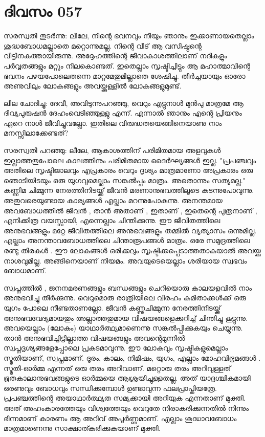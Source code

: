 \newpage
\section{ദിവസം 057}


സരസ്വതി തുടര്‍ന്നു: ലീലേ, നിന്റെ ഭവനവും നീയും ഞാനും ഇക്കാണായതെല്ലാം ശുദ്ധബോധമല്ലാതെ മറ്റൊന്നുമല്ല.  നിന്റെ വീട്‌ ആ വസിഷ്ഠന്റെ വീട്ടിനകത്തായിരുന്നു. അദ്ദേഹത്തിന്റെ ജീവാകാശത്തിലാണ്‌ നദികളും പര്‍വ്വതങ്ങളും മറ്റും നിലകൊണ്ടത്‌. ഇതെല്ലാം സൃഷ്ടിച്ചിട്ടും ആ മഹാത്മാവിന്റെ ഭവനം പഴയപോലെതന്നെ മാറ്റമേതുമില്ലാതെ ശേഷിച്ചു. തീര്‍ച്ചയായും ഓരോ അണുവിലും ലോകങ്ങളും അവയ്ക്കുള്ളില്‍ ലോകങ്ങളുമുണ്ട്‌.

ലീല ചോദിച്ചു: ദേവീ, അവിടുന്നുപറഞ്ഞു, വെറും എട്ടുനാള്‍ മുന്‍പു മാത്രമേ ആ ദിവ്യപുരുഷന്‍ ദേഹംവെടിഞ്ഞുള്ളു എന്ന്. എന്നാല്‍ ഞാനും എന്റെ പ്രിയനും ഏറെ നാള്‍ ജീവിച്ചുവല്ലോ. ഇതിലെ വിരുദ്ധതയെങ്ങിനെയാണു നാം മനസ്സിലാക്കേണ്ടത്‌?

സരസ്വതി പറഞ്ഞു: ലീലേ, ആകാശത്തിന്‌ പരിമിതമായ അളവുകള്‍ ഇല്ലാത്തതുപോലെ കാലത്തിനും പരിമിതമായ ദൈര്‍ഘ്യങ്ങള്‍ ഇല്ല. "പ്രപഞ്ചവും അതിലെ സൃഷ്ടിജാലവും എപ്രകാരം വെറും ദൃശ്യം മാത്രമാണോ അപ്രകാരം ഒരു ഞൊടിയിടയും ഒരു യുഗവുമെല്ലാം സങ്കല്‍പ്പം മാത്രം. അതൊന്നും സത്യമല്ല." കണ്ണിമ ചിമ്മുന്ന നേരത്തിനിടയ്ക്ക്‌ ജീവന്‍ മരണാനുഭവത്തിലൂടെ കടന്നുപോവുന്നു. അതുവരെയുണ്ടായ കാര്യങ്ങള്‍ എല്ലാം മറന്നുപോകുന്നു. അനന്തമായ അവബോധത്തില്‍ ജീവന്‍ , താന്‍ അതാണ്‌ , ഇതാണ്‌ , ഇതെന്റെ പുത്രനാണ്‌ , എനിക്കിത്ര വയസ്സായി, എന്നെല്ലാം ചിന്തിക്കുന്നു. ഈ ജീവിതത്തിലെ അനുഭവങ്ങളും മറ്റേ ജീവിതത്തിലെ അനുഭവങ്ങളും തമ്മില്‍ വ്യത്യാസം ഒന്നുമില്ല. എല്ലാം അനന്താവബോധത്തിലെ ചിന്താരൂപങ്ങള്‍ മാത്രം. ഒരേ സമുദ്രത്തിലെ രണ്ടു തിരകള്‍ . ഈ ലോകങ്ങള്‍ ഒരിക്കലും സൃഷ്ടിക്കപ്പെടാത്തതാകയാല്‍ അവയ്ക്കു നാശവുമില്ല. അങ്ങിനെയാണ്‌ നിയമം. അവയുടെയെല്ലാം ശരിയായ സ്വഭവം ബോധമാണ്‌.

സ്വപ്നത്തില്‍ ,  ജനനമരണങ്ങളും ബന്ധങ്ങളും ചെറിയൊരു കാലയളവില്‍ നാം അനുഭവിച്ചു തീര്‍ക്കുന്നു. വെറുമൊരു രാത്രിയിലെ വിരഹം കമിതാക്കള്‍ക്ക്‌ ഒരു യുഗം പോലെ നീണ്ടതാണല്ലോ. ജീവന്‍ കണ്ണുചിമ്മുന്ന നേരത്തിനിടയ്ക്ക്‌ അനുഭവവേദ്യമായതും അല്ലാത്തതുമായ വിഷയങ്ങളെക്കുറിച്ച്‌ ചിന്തിച്ചു കൂട്ടുന്നു. അവയെല്ലാം (ലോകം) യാഥാര്‍ത്ഥ്യമാണെന്നു സങ്കല്‍പ്പിക്കുകയും ചെയ്യുന്നു. താന്‍ അനുഭവിച്ചിട്ടില്ലാത്ത വിഷയങ്ങളും അവന്റെമുന്നില്‍ സ്വപ്നദൃശ്യങ്ങളേപ്പോലെ പ്രകടമാവുന്നു. ഈ ലോകവും സൃഷ്ടികളുമെല്ലാം സ്മൃതിയാണ്‌, സ്വപ്നമാണ്‌. ദൂരം, കാലം, നിമിഷം, യുഗം, എല്ലാം മോഹവിഭ്രമങ്ങള്‍ . സ്മൃതി-ഓര്‍മ്മ എന്നത്‌ ഒരു തരം അറിവാണ്‌. മറ്റൊരു തരം അറിവുള്ളത്‌ ഭൂതകാലാനുഭവങ്ങളുടെ ഓര്‍മ്മയെ ആശ്രയിച്ചുള്ളതല്ല. അത്‌ യാദൃശ്ചികമായി ഒരണുവും ബോധവും സന്ധിക്കുമ്പോള്‍ ഉണ്ടാവുന്ന ഫലപ്രാപ്തിയത്രേ. പ്രപഞ്ചത്തിന്റെ അയാഥാര്‍ത്ഥ്യത സമ്യക്കായി അറിയുക എന്നതാണ്‌ മുക്തി. അത്‌ അഹംകാരത്തേയും വിശ്വത്തേയും വെറുതേ നിരാകരിക്കുന്നതില്‍ നിന്നും ഭിന്നമാണ്‌ കാരണം ആ അറിവ്‌ അപൂര്‍ണ്ണമാണ്‌. എല്ലാം ശുദ്ധാവബോധം മാത്രമാണെന്നു സാക്ഷാത്കരിക്കുകയാണ്‌ മുക്തി.
